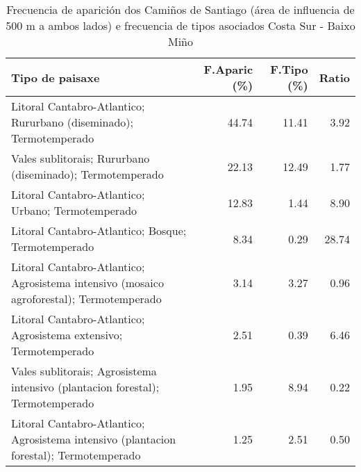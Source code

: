 \begin{table}[p]
\centering
\caption{Frecuencia de aparición dos Camiños de Santiago (área de influencia de 500 m a ambos lados) e frecuencia de tipos asociados Costa Sur - Baixo Miño} 
\label{vcamino3}
\begin{tabular}{lrrr}
  \hline
Tipo de paisaxe & F.Aparic (\%) & F.Tipo (\%) & Ratio \\ 
  \hline
Litoral Cantabro-Atlantico; Rururbano (diseminado); Termotemperado & 44.74 & 11.41 & 3.92 \\ 
  Vales sublitorais; Rururbano (diseminado); Termotemperado & 22.13 & 12.49 & 1.77 \\ 
  Litoral Cantabro-Atlantico; Urbano; Termotemperado & 12.83 & 1.44 & 8.90 \\ 
  Litoral Cantabro-Atlantico; Bosque; Termotemperado & 8.34 & 0.29 & 28.74 \\ 
  Litoral Cantabro-Atlantico; Agrosistema intensivo (mosaico agroforestal); Termotemperado & 3.14 & 3.27 & 0.96 \\ 
  Litoral Cantabro-Atlantico; Agrosistema extensivo; Termotemperado & 2.51 & 0.39 & 6.46 \\ 
  Vales sublitorais; Agrosistema intensivo (plantacion forestal); Termotemperado & 1.95 & 8.94 & 0.22 \\ 
  Litoral Cantabro-Atlantico; Agrosistema intensivo (plantacion forestal); Termotemperado & 1.25 & 2.51 & 0.50 \\ 
   \hline
\end{tabular}
\end{table}
